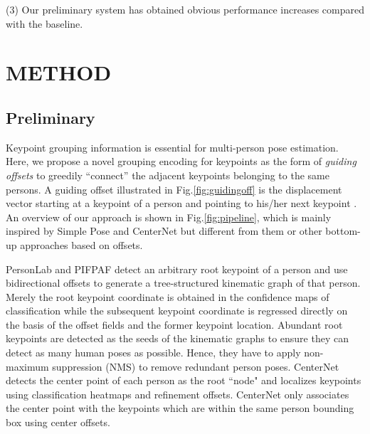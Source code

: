\documentclass{article}
\begin{document}
(3) Our preliminary system has obtained obvious performance increases compared with the baseline. 















































\section{METHOD}
\label{sec:Section2}




\subsection{Preliminary}


Keypoint grouping information is essential for multi-person pose estimation. Here, we propose a novel grouping encoding for keypoints as the form of \textit{guiding offsets} to greedily ``connect'' the adjacent keypoints belonging to the same persons. A guiding offset illustrated in Fig.\ref{fig:guidingoff} is the displacement vector starting at a keypoint  of a person and pointing to his/her next keypoint . 
An overview of our approach is shown in Fig.\ref{fig:pipeline}, which is mainly inspired by Simple Pose \cite{li2020simple} and CenterNet \cite{Zhou:2019ta} but different from them or other bottom-up approaches \cite{Papandreou2018PersonLab, kreiss2019pifpaf, cheng2019higherhrnet, Newell2017Associative} based on offsets.


PersonLab \cite{Papandreou2018PersonLab} and PIFPAF \cite{kreiss2019pifpaf} detect an arbitrary root keypoint of a person and use bidirectional offsets to generate a tree-structured kinematic graph of that person. Merely the root keypoint coordinate is obtained in the confidence maps of classification while the subsequent keypoint coordinate is regressed directly on the basis of the offset fields and the former keypoint location. Abundant root keypoints are detected as the seeds of the kinematic graphs to ensure they can detect as many human poses as possible. Hence, they have to apply non-maximum suppression (NMS) to remove redundant person poses. 
CenterNet \cite{Zhou:2019ta} detects the center point of each person as the root ``node" and localizes keypoints using classification heatmaps and refinement offsets. CenterNet only associates the center point with the keypoints which are within the same person bounding box using center offsets. 
\end{document}
